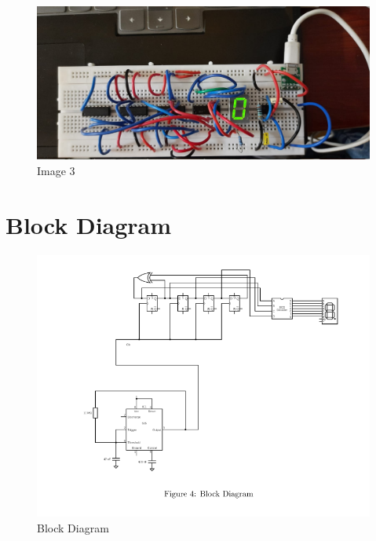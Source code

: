 \documentclass{article}
\begin{document}
\FloatBarrier
\begin{figure}[ht]
\centering
\includegraphics[width=0.7\linewidth]{figs/3.png}
\caption{Image 3}
\end{figure}
\FloatBarrier
\section{Block Diagram}
\begin{figure}[ht]
\centering
\includegraphics[width=0.7\linewidth]{figs/BlockDiagram.png}
\caption{Block Diagram}
\end{figure}
\FloatBarrier
\end{document}

